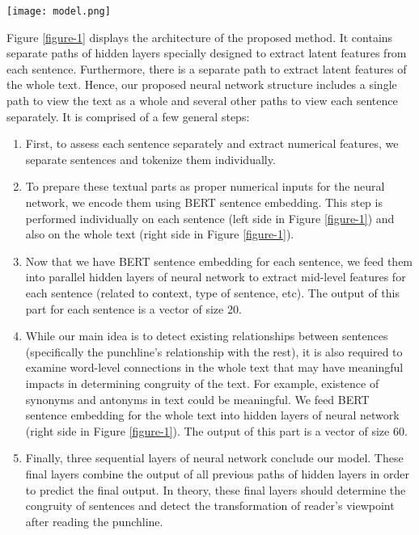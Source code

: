 \documentclass{article}
\begin{document}
\begin{figure*}[t]
\begin {center}
 \texttt{[image: model.png]}
 \caption{Components of the proposed method}
  \label{figure-1}
 \end {center}
\end{figure*}

Figure \ref{figure-1} displays the architecture of the proposed method. It contains separate paths of hidden layers specially designed to extract latent features from each sentence. Furthermore, there is a separate path to extract latent features of the whole text. Hence, our proposed neural network structure includes a single path to view the text as a whole and several other paths to view each sentence separately. It is comprised of a few general steps:

\begin{enumerate}
    \item First, to assess each sentence separately and extract numerical features, we separate sentences and tokenize them individually.
    \item To prepare these textual parts as proper numerical inputs for the neural network, we encode them using BERT sentence embedding. This step is performed individually on each sentence (left side in Figure \ref{figure-1}) and also on the whole text (right side in Figure \ref{figure-1}).
    \item Now that we have BERT sentence embedding for each sentence, we feed them into parallel hidden layers of neural network to extract mid-level features for each sentence (related to context, type of sentence, etc). The output of this part for each sentence is a vector of size 20.
    \item While our main idea is to detect existing relationships between sentences (specifically the punchline's relationship with the rest), it is also required to examine word-level connections in the whole text that may have meaningful impacts in determining congruity of the text. For example, existence of synonyms and antonyms in text could be meaningful. We feed BERT sentence embedding for the whole text into hidden layers of neural network (right side in Figure \ref{figure-1}). The output of this part is a vector of size 60.
    \item Finally, three sequential layers of neural network conclude our model. These final layers combine the output of all previous paths of hidden layers in order to predict the final output. In theory, these final layers should determine the congruity of sentences and detect the transformation of reader's viewpoint after reading the punchline.
\end{enumerate}
\end{document}
